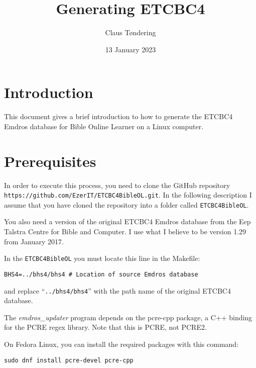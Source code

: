 \documentclass[11pt,oneside,a4paper,article]{memoir}
\title{Generating ETCBC4}
\author{Claus Tøndering}
\date{13 January 2023}
\begin{document}
\maketitle


\chapter{Introduction}

This document gives a brief introduction to how to generate the ETCBC4 Emdros database for Bible
Online Learner on a Linux computer.

\chapter{Prerequisites}

In order to execute this process, you need to clone the GitHub repository
\texttt{https://github.com/\-EzerIT/ETCBC4BibleOL.git}. In the following description I assume that you
have cloned the repository into a folder called \texttt{ETCBC4BibleOL}.

You also need a version of the original ETCBC4 Emdros database from the Eep Talstra Centre for Bible
and Computer. I use what I believe to be version 1.29 from January 2017.

In the \texttt{ETCBC4BibleOL} you must locate this line in the Makefile:

\vspace{1ex}

\quad\texttt{BHS4=../bhs4/bhs4  \# Location of source Emdros database}

\vspace{1ex}

\noindent
and replace ``\texttt{../bhs4/bhs4}'' with the path name of the original ETCBC4 database.

The \emph{emdros\_updater} program depends on the pcre-cpp package, a
C++ binding for the PCRE regex library. Note that this is PCRE, not
PCRE2.

On Fedora Linux, you can install the required packages with this
command:

\vspace{1ex}

\quad\texttt{sudo dnf install pcre-devel pcre-cpp}
\end{document}

